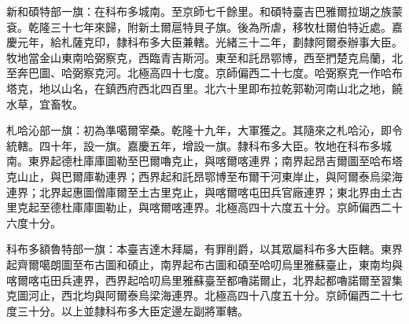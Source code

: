 \begin{pinyinscope}
新和碩特部一旗：在科布多城南。至京師七千餘里。和碩特臺吉巴雅爾拉瑚之族蒙袞。乾隆三十七年來歸，附新土爾扈特貝子旗。後為所虐，移牧杜爾伯特近處。嘉慶元年，給札薩克印，隸科布多大臣兼轄。光緒三十二年，劃隸阿爾泰辦事大臣。牧地當金山東南哈弼察克，西臨青吉斯河。東至和託昂鄂博，西至捫楚克烏蘭，北至奔巴圖、哈弼察克河。北極高四十七度。京師偏西二十七度。哈弼察克一作哈布塔克，地以山名，在鎮西府西北四百里。北六十里即布拉乾郭勒河南山北之地，饒水草，宜畜牧。

札哈沁部一旗：初為準噶爾宰桑。乾隆十九年，大軍獲之。其隨來之札哈沁，即令統轄。四十年，設一旗。嘉慶五年，增設一旗。隸科布多大臣。牧地在科布多城南。東界起德杜庫庫圖勒至巴爾嚕克止，與喀爾喀連界；南界起昂吉爾圖至哈布塔克山止，與巴爾庫勒連界；西界起和託昂鄂博至布爾干河東岸止，與阿爾泰烏梁海連界；北界起惠圖僧庫爾至土古里克止，與喀爾喀屯田兵官廠連界；東北界由土古里克起至德杜庫庫圖勒止，與喀爾喀連界。北極高四十六度五十分。京師偏西二十六度十分。

科布多額魯特部一旗：本臺吉達木拜屬，有罪削爵，以其眾屬科布多大臣轄。東界起齊爾噶朗圖至布古圖和碩止，南界起布古圖和碩至哈叨烏里雅蘇臺止，東南均與喀爾喀屯田兵連界，西界起哈叨烏里雅蘇臺至都嚕諾爾止，北界起都嚕諾爾至習集克圖河止，西北均與阿爾泰烏梁海連界。北極高四十八度五十分。京師偏西二十七度三十分。以上並隸科布多大臣定邊左副將軍轄。


\end{pinyinscope}
